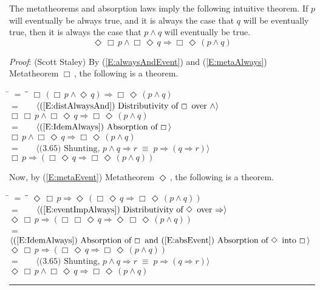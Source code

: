 \documentclass[12pt, fleqn, leqno]{article}
\newcommand{\lgap}{2pt}                             %
\newcommand{\mymathindent}{24pt}                    %
\newcommand{\equivs}{\ensuremath{\;\equiv\;}}       %
\newcommand{\impl}{\ensuremath{\Rightarrow}}        %
\newcommand{\Event}{\Diamond\,}
\newcommand{\Always}{\Box\,}
\newcommand{\myqed}{\rule[-.23ex]{1.2ex}{2.0ex}}
\newcommand{\myqedtab}{\hspace{384pt}}              %
\newcommand{\Gll} {\langle}                         %
\newcommand{\Ggg} {\rangle}                         %
\newcommand{\Hint}[1]     {\ \ \ $\Gll              \mbox{#1} \Ggg$ }   %
\begin{document}
The metatheorems and absorption laws imply the following intuitive theorem.
If $p$ will eventually be always true, and it is always the case that $q$ will be eventually true, then it is always the case that $p\land q$ will eventually be true.
\begin{equation}\label{E:eventAlwaysPAndAlwaysEventQ}
\Event\Always p\land \Always\Event q \impl \Always\Event (p\land q)
\end{equation}

\emph{Proof}: (Scott Staley) By (\ref{E:alwaysAndEvent}) and (\ref{E:metaAlways}) Metatheorem $\Always$, the following is a theorem.
\begin{tabbing}
\hspace{\mymathindent} \= $= \;$ \= \myqedtab \= \kill
\> \>   $\Always (\Always p \land \Event q) \impl \Always\Event (p \land q)$\\[\lgap]
\> $=$  \>  \Hint{(\ref{E:distAlwaysAnd}) Distributivity of $\Always$ over $\land$}\\[\lgap]
\> \>   $\Always \Always p \land \Always\Event q \impl \Always\Event (p \land q)$\\[\lgap]
\> $=$  \>  \Hint{(\ref{E:IdemAlways}) Absorption of $\Always$}\\[\lgap]
\> \>   $\Always p \land \Always\Event q \impl \Always\Event (p \land q)$\\[\lgap]
\> $=$  \>  \Hint{(3.65) Shunting, $p\land q\impl r\equivs p\impl (q\impl r)$}\\[\lgap]
\> \>   $\Always p \impl (\Always\Event q \impl \Always\Event (p \land q))$
\end{tabbing}
Now, by (\ref{E:metaEvent}) Metatheorem $\Event$, the following is a theorem.
\begin{tabbing}
\hspace{\mymathindent} \= $= \;$ \= \myqedtab \= \kill
\> \>   $\Event\Always p \impl \Event(\Always\Event q \impl \Always\Event (p \land q))$\\[\lgap]
\> $=$  \>  \Hint{(\ref{E:eventImpAlways}) Distributivity of $\Event$ over $\impl$}\\[\lgap]
\> \>   $\Event\Always p \impl (\Always\Always\Event q \impl \Event\Always\Event (p \land q))$\\[\lgap]
\> $=$  \>  \Hint{(\ref{E:IdemAlways}) Absorption of $\Always$ and (\ref{E:absEvent}) Absorption of $\Event$ into $\Always$}\\[\lgap]
\> \>   $\Event\Always p \impl (\Always\Event q \impl \Always\Event (p \land q))$\\[\lgap]
\> $=$  \>  \Hint{(3.65) Shunting, $p\land q\impl r\equivs p\impl (q\impl r)$}\\[\lgap]
\> \>   $\Event\Always p\land \Always\Event q \impl \Always\Event (p\land q)$ \quad \myqed
\end{tabbing}
\end{document}
